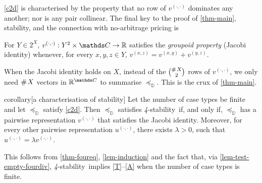\documentclass[12pt,a4paper,twoside]{article}
\newcommand{\preceqb}{\mathbin{\preceq}}
\newcommand{\countof}{\mathbin{\#}\hskip1pt}
\newcommand{\ext}{\mathrel{\mc R}}
\newcommand{\mbbd}{{\mathds D}}
\newcommand{\mbbc}{{\mathds C}}
\newcommand{\xy}{{(x, y)}}
\newcommand{\yz}{{(y,z)}}
\newcommand{\xz}{{(x,z)}}
\newcommand{\dd}{{(\cdot,\cdot)}}
\newcommand{\stability}{\textit{4}-\textup{{stability}}}
\begin{document}
\ref{c2d} is characterised by the property that no row of $v^{\dd}$ dominates
any another; nor is any pair collinear.  The final key to the proof of
\cref{thm-main}, {stability}, and the connection with no-arbitrage pricing is
\begin{definition*} %
  For $Y \in 2^{X}$, $v^{\dd} : Y^{2}\times \mbbc \rightarrow \R$
  satisfies the \emph{groupoid property} (Jacobi identity) whenever, for every
  $x , y , z \in Y$, $v^{\xz} = v^{\xy} + v^{\yz}$.
\end{definition*}
When the Jacobi identity holds on $X$, instead of the $\binom{\countof X}{2}$
rows of $v^{\dd}$, we only need $\countof X$ vectors in $\R^\mbbc$ to summarise
$\preceqb_\mbbd$. This is the crux of \cref{thm-main}.

   
\begin{theoremEnd}{corollary}[a characterisation of
  {stability}]\label{cor-foureq} Let the number of case types be finite and let
  $\preceq_{\mbbd}$ satisfy \ref{c2d}. Then $\preceq_{\mbbd}$ satisfies
  \stability\ if, and only if, $\preceq_{\mbbd}$ has a pairwise representation
  $v^{\dd}$ that satisfies the Jacobi identity. Moreover, for every other
  pairwise representation $u^{\dd}$, there exists $\lambda >0$, such that
  $u^{\dd} = \lambda v^{\dd}$.
 \end{theoremEnd}
 \begin{proofEnd}%
   This follows from \cref{thm-foureq}, \cref{lem-induction} and the fact that,
   via \cref{lem-test-empty-fourdiv}, \stability\ implies \ref{T}--\ref{A} when
   the number of case types is finite. \label{proof-cor-foureq}
\end{proofEnd}
\end{document}
